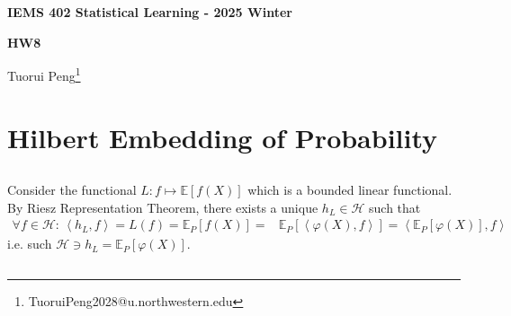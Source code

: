\documentclass[11pt,a4paper]{ctexart}
\numberwithin{equation}{section}%
\begin{document}
\begin{center}\thispagestyle{plain}

{\LARGE\textbf{IEMS 402 Statistical Learning - 2025 Winter}}

{\Large\textbf{HW8}}

Tuorui Peng\footnote{TuoruiPeng2028@u.northwestern.edu}
\end{center}

\thispagestyle{myheadings}
\pagestyle{myheadings}




\section{Hilbert Embedding of Probability}



\subsection{}

Consider the functional $ L: f\mapsto \mathbb{E}\left[ f(X) \right]  $ which is a bounded linear functional. By Riesz Representation Theorem, there exists a unique $ h_L\in \mathcal{H} $ such that 
\begin{align*}
     \forall f\in\mathcal{H}:\, \left\langle h_L,f \right\rangle = L(f)=\mathbb{E}_P\left[ f(X) \right]=& \mathbb{E}_P\left[\left\langle \varphi (X), f \right\rangle  \right]  =\left\langle \mathbb{E}_P\left[ \varphi (X) \right] ,f  \right\rangle 
\end{align*}
i.e. such $ \mathcal{H}\ni h_L = \mathbb{E}_P\left[ \varphi (X) \right]  $.


\subsection{}
\end{document}
